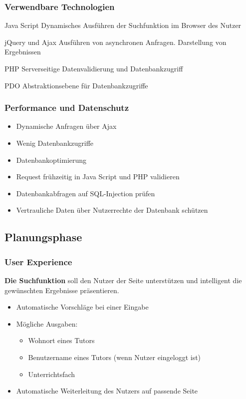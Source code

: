 \begin{frame} 
  \frametitle{Verwendbare Technologien}
  \begin{block}{Java Script}
    Dynamisches Ausführen der Suchfunktion im Browser des Nutzer
  \end{block}
  \begin{block}{jQuery und Ajax}
    Ausführen von asynchronen Anfragen. Darstellung von Ergebnissen
  \end{block}
  \begin{block}{PHP}
    Serverseitige Datenvalidierung und Datenbankzugriff
  \end{block}
  \begin{block}{PDO}
    Abstraktionsebene für Datenbankzugriffe
  \end{block}
\end{frame}

\begin{frame} 
  \frametitle{Performance und Datenschutz}
  \begin{itemize}
    \item Dynamische Anfragen über Ajax
    \item Wenig Datenbankzugriffe
    \item Datenbankoptimierung
  \end{itemize} 
  \begin{itemize}
    \item Request frühzeitig in Java Script und PHP validieren 
    \item Datenbankabfragen auf SQL-Injection prüfen
    \item Vertrauliche Daten über Nutzerrechte der Datenbank schützen
  \end{itemize}
\end{frame}

\subsection{Planungsphase}

\begin{frame}
  \frametitle{User Experience}
  \textbf{Die Suchfunktion} soll den Nutzer der Seite unterstützen und intelligent die 
  gewünschten Ergebnisse präsentieren. \newline \newline
  \begin{itemize}
    \item Automatische Vorschläge bei einer Eingabe
    \item Mögliche Ausgaben:
    \begin{itemize}
      \item Wohnort eines Tutors
      \item Benutzername eines Tutors (wenn Nutzer eingeloggt ist)
      \item Unterrichtsfach
    \end{itemize}
    \item Automatische Weiterleitung des Nutzers auf passende Seite
  \end{itemize} 
 \end{frame}
 
